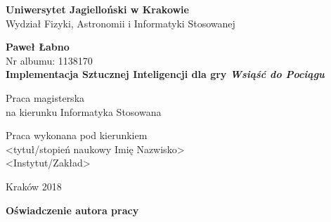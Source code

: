 \documentclass[12pt, oneside]{report}
\begin{document}
  
\thispagestyle{empty}
\begin{titlepage}
    \begin{center}

           \Large
	\textbf{Uniwersytet Jagielloński w Krakowie}\vspace{0.2cm}\\ Wydział Fizyki, Astronomii i Informatyki Stosowanej
               \vspace*{1cm}
               
         \vspace{3cm}
         \Large
          \textbf{Paweł Łabno}\\\vspace{0.5cm}
         \normalsize Nr albumu: 1138170\\
             \vspace{2cm}
        \Huge
        \textbf{Implementacja Sztucznej Inteligencji dla gry \textit{Wsiąść do Pociągu}}
      
        \vspace{1.5cm}
        \normalsize
        Praca magisterska\\
        na kierunku Informatyka Stosowana\\ \vspace{0.15cm}
        
        \vfill
        \vspace{2cm}
       \begin{minipage}{1\textwidth}
\begin{flushright}
Praca wykonana pod kierunkiem\\
<tytuł/stopień naukowy Imię Nazwisko>\\
<Instytut/Zakład>
\end{flushright}
\end{minipage}
        
        \vspace{2cm}
        \begin{center}
      Kraków 2018
        \end{center}
    \end{center}
\end{titlepage}

\newpage 
 \thispagestyle{empty}
\vspace{2.5cm}
\begin{flushleft}
\large \textbf{Oświadczenie autora pracy}\vspace{0.6cm}\\
\end{flushleft}
\end{document}
